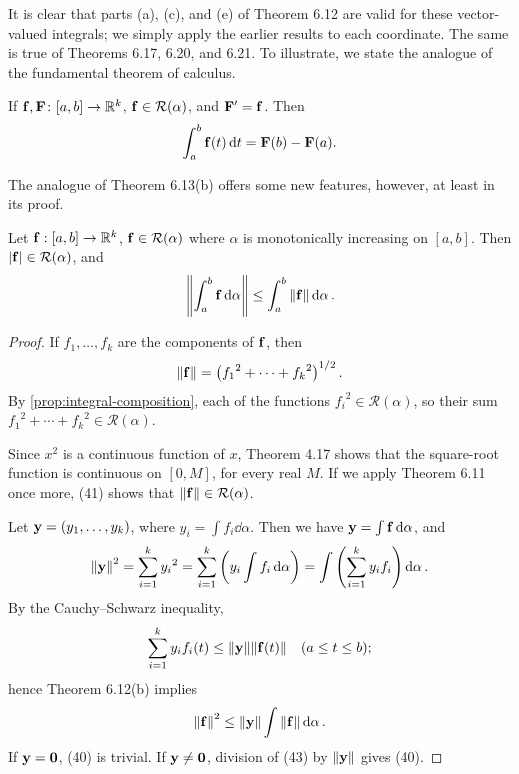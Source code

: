 It is clear that parts (a), (c), and (e) of Theorem 6.12 are valid for these
vector-valued integrals; we simply apply the earlier results to each coordinate.
The same is true of Theorems 6.17, 6.20, and 6.21. To illustrate, we state the analogue of the fundamental theorem of calculus.

\begin{theorem}
If $\vb{f},\vb{F}\colon[a,b]\to\mathbb R^k$, $\vb{f}\in\mathcal{R}(\alpha)$, and $\vb{F}^\prime=\vb{f}$. Then
\begin{equation}
\int_{a}^{b}\vb{f}(t)\dd{t}=\vb{F}(b)-\vb{F}(a).
\end{equation}
\end{theorem}

The analogue of Theorem 6.13(b) offers some new features, however, at
least in its proof. 

\begin{lemma}
Let $\vb{f}:[a,b]\to\mathbb R^k$, $\vb{f}\in\mathcal{R}(\alpha)$ where $\alpha$ is monotonically increasing on $[a,b]$. 
Then $|\vb{f}|\in\mathcal{R}(\alpha)$, and
\[\norm{\int_{a}^{b}\vb{f}\dd{\alpha}}\le\int_{a}^{b}\norm{\vb{f}}\dd{\alpha}.\]
\end{lemma}

\begin{proof}
If $f_1,\dots,f_k$ are the components of $\vb{f}$, then
\[\norm{\vb{f}}=\left({f_1}^2+\cdots+{f_k}^2\right)^{1/2}.\]
By \ref{prop:integral-composition}, each of the functions ${f_i}^2\in\mathcal{R}(\alpha)$, so their sum ${f_1}^2+\cdots+{f_k}^2\in\mathcal{R}(\alpha)$.

Since $x^2$ is a continuous function of $x$, Theorem 4.17 shows that the square-root function is continuous on $[0,M]$, for every real $M$.
If we apply Theorem 6.11 once more, (41) shows that $\norm{\vb{f}}\in\mathcal{R}(\alpha)$.

Let $\vb{y}=(y_1,\dots,y_k)$, where $y_i=\int f_i\dd{\alpha}$. Then we have $\vb{y}=\int\vb{f}\dd{\alpha}$, and
\[\norm{\vb{y}}^2=\sum_{i=1}^{k}{y_i}^2=\sum_{i=1}^{k}\left(y_i\int f_i\dd{\alpha}\right)=\int\left(\sum_{i=1}^{k}y_i f_i\right)\dd{\alpha}.\]
By the Cauchy--Schwarz inequality,
\[\sum_{i=1}^{k}y_i f_i(t)\le\norm{\vb{y}}\norm{\vb{f}(t)}\quad(a\le t\le b);\]
hence Theorem 6.12(b) implies
\[\norm{\vb{f}}^2\le\norm{\vb{y}}\int\norm{\vb{f}}\dd{\alpha}.\]
If $\vb{y}=\vb{0}$, (40) is trivial. If $\vb{y}\neq\vb{0}$, division of (43) by $\norm{\vb{y}}$ gives (40).
\end{proof}

\pagebreak

